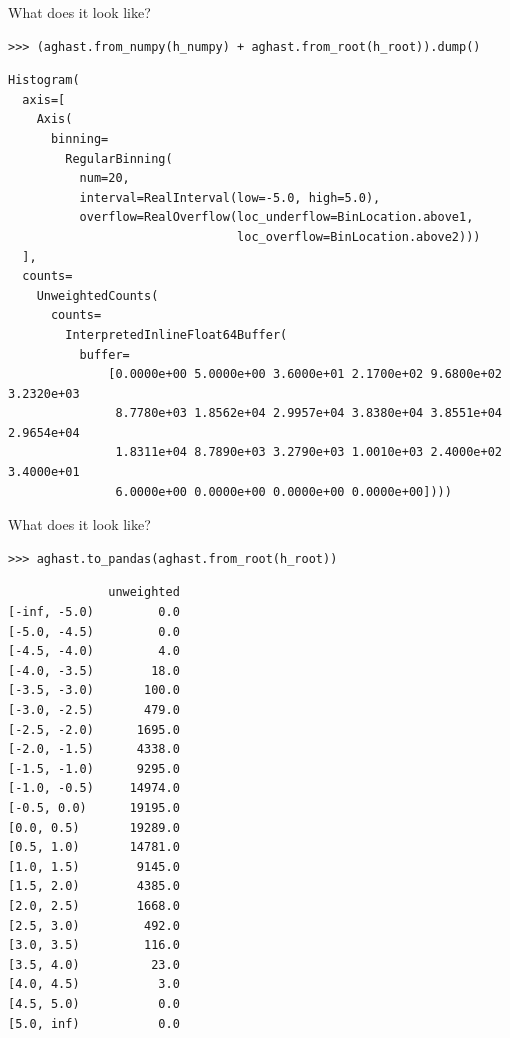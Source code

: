 \documentclass[aspectratio=169]{beamer}
\begin{document}
\begin{frame}[fragile]{What does it look like?}
\vspace{0.5 cm}
\small
\begin{verbatim}
>>> (aghast.from_numpy(h_numpy) + aghast.from_root(h_root)).dump()
\end{verbatim}

\scriptsize
\begin{verbatim}
Histogram(
  axis=[
    Axis(
      binning=
        RegularBinning(
          num=20,
          interval=RealInterval(low=-5.0, high=5.0),
          overflow=RealOverflow(loc_underflow=BinLocation.above1,
                                loc_overflow=BinLocation.above2)))
  ],
  counts=
    UnweightedCounts(
      counts=
        InterpretedInlineFloat64Buffer(
          buffer=
              [0.0000e+00 5.0000e+00 3.6000e+01 2.1700e+02 9.6800e+02 3.2320e+03
               8.7780e+03 1.8562e+04 2.9957e+04 3.8380e+04 3.8551e+04 2.9654e+04
               1.8311e+04 8.7890e+03 3.2790e+03 1.0010e+03 2.4000e+02 3.4000e+01
               6.0000e+00 0.0000e+00 0.0000e+00 0.0000e+00])))
\end{verbatim}
\end{frame}

\begin{frame}[fragile]{What does it look like?}
\vspace{0.5 cm}
\small
\begin{verbatim}
>>> aghast.to_pandas(aghast.from_root(h_root))
\end{verbatim}

\tiny
\begin{verbatim}
              unweighted
[-inf, -5.0)         0.0
[-5.0, -4.5)         0.0
[-4.5, -4.0)         4.0
[-4.0, -3.5)        18.0
[-3.5, -3.0)       100.0
[-3.0, -2.5)       479.0
[-2.5, -2.0)      1695.0
[-2.0, -1.5)      4338.0
[-1.5, -1.0)      9295.0
[-1.0, -0.5)     14974.0
[-0.5, 0.0)      19195.0
[0.0, 0.5)       19289.0
[0.5, 1.0)       14781.0
[1.0, 1.5)        9145.0
[1.5, 2.0)        4385.0
[2.0, 2.5)        1668.0
[2.5, 3.0)         492.0
[3.0, 3.5)         116.0
[3.5, 4.0)          23.0
[4.0, 4.5)           3.0
[4.5, 5.0)           0.0
[5.0, inf)           0.0
\end{verbatim}
\end{frame}

\end{document}
